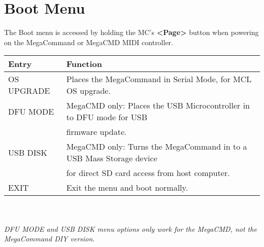 \chapter{Boot Menu}
The Boot menu is accessed by holding the MC's \textbf{<Page>} button when powering on the MegaCommand or MegaCMD MIDI controller.
\\
\begin{tabular}{|l|l|}
\hline
\rowcolor[HTML]{C0C0C0} 
Entry                                  & Function                                                                       \\ \hline
OS UPGRADE        & Places the MegaCommand in Serial Mode, for MCL OS upgrade.                                                         \\ \hline
DFU MODE       & MegaCMD only: Places the USB Microcontroller in to DFU mode for USB\\& firmware update.                                                            \\ \hline
USB DISK    & MegaCMD only: Turns the MegaCommand in to a USB Mass Storage device\\& for direct SD card access from host computer.                                                          \\ \hline
EXIT      &  Exit the menu and boot normally.                                 \\ \hline                   
\end{tabular}
\\\\
\textit{DFU MODE and USB DISK menu options only work for the MegaCMD, not the MegaCommand DIY version.}
\\
\\